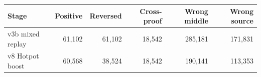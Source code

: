 \begin{tabular}{@{}lrrrrr@{}}
\toprule
Stage & Positive & Reversed & Cross-proof & Wrong middle & Wrong source \\
\midrule
v3b mixed replay & 61,102 & 61,102 & 18,542 & 285,181 & 171,831 \\
v8 Hotpot boost & 60,568 & 38,524 & 18,542 & 190,141 & 113,353 \\
\bottomrule
\end{tabular}
